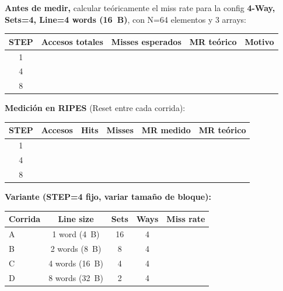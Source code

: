 \documentclass[12pt, a4paper]{article}
\begin{document}
\begin{actividad}
    \textbf{Antes de medir,} calcular teóricamente el miss rate para la config
    \textbf{4-Way, Sets=4, Line=4 words (16~B)}, con N=64 elementos y 3 arrays:

    \vspace{0.2cm}
    \begin{center}
    \renewcommand{\arraystretch}{1.8}
    \begin{tabular}{|c|c|c|c|c|}
        \hline
        \textbf{STEP} & \textbf{Accesos totales} & \textbf{Misses esperados} & \textbf{MR teórico} & \textbf{Motivo} \\
        \hline
        1 & & & & \\
        \hline
        4 & & & & \\
        \hline
        8 & & & & \\
        \hline
    \end{tabular}
    \end{center}

    \textbf{Medición en RIPES} (Reset entre cada corrida):

    \vspace{0.2cm}
    \begin{center}
    \renewcommand{\arraystretch}{1.8}
    \begin{tabular}{|c|c|c|c|c|c|}
        \hline
        \textbf{STEP} & \textbf{Accesos} & \textbf{Hits} & \textbf{Misses} &
        \textbf{MR medido} & \textbf{MR teórico} \\
        \hline
        1 & & & & & \\
        \hline
        4 & & & & & \\
        \hline
        8 & & & & & \\
        \hline
    \end{tabular}
    \end{center}

    \textbf{Variante (STEP=4 fijo, variar tamaño de bloque):}

    \vspace{0.2cm}
    \begin{center}
    \renewcommand{\arraystretch}{1.5}
    \begin{tabular}{|l|c|c|c|c|}
        \hline
        \textbf{Corrida} & \textbf{Line size} & \textbf{Sets} & \textbf{Ways} & \textbf{Miss rate} \\
        \hline
        A & 1 word (4~B)  & 16 & 4 & \\
        \hline
        B & 2 words (8~B) &  8 & 4 & \\
        \hline
        C & 4 words (16~B)&  4 & 4 & \\
        \hline
        D & 8 words (32~B)&  2 & 4 & \\
        \hline
    \end{tabular}
    \end{center}
\end{actividad}
\end{document}
